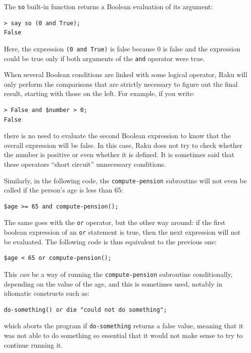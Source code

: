 The {\tt so} built-in function returns a Boolean evaluation of 
its argument:

\begin{verbatim}
> say so (0 and True);
False
\end{verbatim}
%
Here, the expression {\tt (0 and True)} is false because 0 
is false and the expression could be true only if both arguments 
of the {\tt and} operator were true.

When several Boolean conditions are linked with some logical 
operator, Raku will only perform the comparisons that are 
strictly necessary to figure out the final result, starting 
with those on the left. For example, if you write:

\begin{verbatim}
> False and $number > 0;
False
\end{verbatim}
%
there is no need to evaluate the second Boolean expression 
to know that the overall expression will be false. In this case, 
Raku does not try to check whether the number is positive or 
even whether it is defined. It is sometimes said that 
these operators ``short circuit'' unnecessary conditions.

Similarly, in the following code, the {\tt compute-pension} 
subroutine will not even be called if the person's age is 
less than 65:

\begin{verbatim}
$age >= 65 and compute-pension();
\end{verbatim}
%
The same goes with the {\tt or} operator, but the other way 
around: if the first boolean expression of an {\tt or} 
statement is true, then the next expression will not be 
evaluated. The following code is thus equivalent to the previous 
one:

\begin{verbatim}
$age < 65 or compute-pension();
\end{verbatim}
% 
This \emph{can} be a way of running the {\tt compute-pension} 
subroutine conditionally, depending on the value of the age, and 
this is sometimes used, notably in idiomatic constructs such as:

\begin{verbatim}
do-something() or die "could not do something";
\end{verbatim}
%
which aborts the program if {\tt do-something} returns a false 
value, meaning that it was not able to do something 
so essential that it would not make sense to try to continue 
running it.

